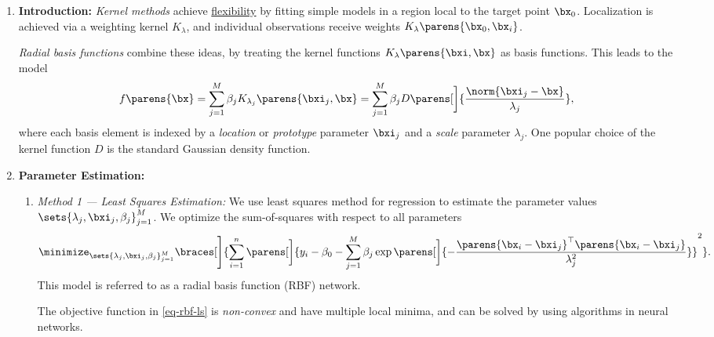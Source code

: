 \documentclass[12pt]{article}
\begin{document}
\begin{enumerate}[label=\textbf{\arabic*.}]

	\item \textbf{Introduction:} \textit{Kernel methods} achieve \underline{flexibility} by fitting simple models in a region local to the target point $\bx_0$. Localization is achieved via a weighting kernel $ K_\lambda $, and individual observations receive weights $ K_\lambda \parens{\bx_0, \bx_i}$. 
	
	\textit{Radial basis functions} combine these ideas, by treating the kernel functions $K_\lambda \parens{\bxi, \bx}$ as basis functions. This leads to the model
	\begin{align*}
		f \parens{\bx} = \sum_{j=1}^M \beta_j K_{\lambda_j} \parens{\bxi_j, \bx} = \sum_{j=1}^M \beta_j D \parens[\bigg]{\frac{{\norm{\bxi_j - \bx}}}{\lambda_j}}, 
	\end{align*}
	where each basis element is indexed by a \textit{location} or \textit{prototype} parameter $\bxi_j$ and a \textit{scale} parameter $\lambda_j$. One popular choice of the kernel function $D$ is the standard Gaussian density function. 
	
	\item \textbf{Parameter Estimation:} 
	\begin{enumerate}
		\item \textit{Method 1 --- Least Squares Estimation:} We use least squares method for regression to estimate the parameter values $\sets{ \lambda_j, \bxi_j, \beta_j }_{j=1}^M$. We optimize the sum-of-squares with respect to all parameters 
		\begin{equation}\label{eq-rbf-ls}
			\minimize_{\sets{ \lambda_j, \bxi_j, \beta_j }_{j=1}^M} \braces[\Bigg]{\sum_{i=1}^n \parens[\bigg]{y_i - \beta_0 - \sum_{j=1}^M \beta_j \exp \parens[\bigg]{- \frac{\parens{\bx_i - \bxi_j}^\top \parens{\bx_i - \bxi_j}}{\lambda_j^2}}}^2}. 
		\end{equation}
		This model is referred to as a radial basis function (RBF) network. 
		
		The objective function in \eqref{eq-rbf-ls} is \emph{non-convex} and have multiple local minima, and can be solved by using algorithms in neural networks. 
		

\end{enumerate}
\end{enumerate}
\end{document}
